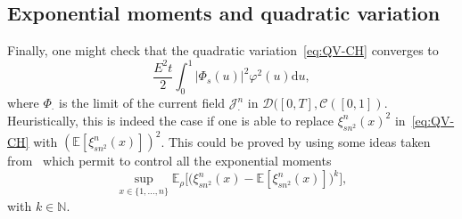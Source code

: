 \documentclass[AHL,Unicode,longabstracts]{cedram}
\newcommand{\bb}[1]{{\mathbb #1}}
\newcommand{\mc}[1]{{\mathcal #1}}
\renewcommand{\mc}[1]{{\mathcal #1}}
\newcommand*{\dd}{\mathrm{d}}
\newcommand*{\du}{\dd u}
\begin{document}
\subsection{Exponential moments and quadratic variation}

Finally, one might check that the quadratic variation~\eqref{eq:QV-CH} converges to
\[
\frac{E^2 t}{2} \int_0^1 |\Phi_s(u)|^2\varphi^2(u)\du,
\]
where $\Phi_\cdot$ is the limit of the current field $\mc J_\cdot^n$ in $\mc D([0,T],\mc C([0,1])$. Heuristically, this is indeed the case if one is able to replace $\xi_{sn^2}^n(x)^2$ in~\eqref{eq:QV-CH} with $(\bb E[\xi_{sn^2}^n(x)])^2$. This could be proved by using some ideas taken from~\cite[Lemma~4.3]{GLM} which permit to control all the exponential moments
\[
\sup_{x\in\{1,\dots,n\}} \bb E_\rho \big[\big(\xi_{sn^2}^n(x)-\bb E[\xi_{sn^2}^n(x)]\big)^k\big],
\]
with $k\in\mathbb N$.




\end{document}

